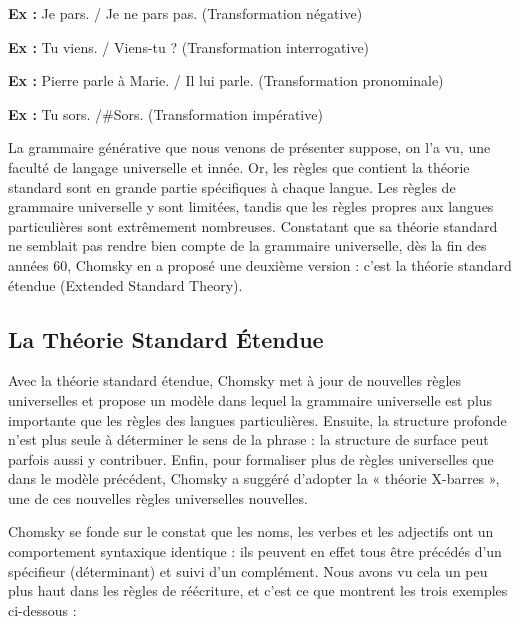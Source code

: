 
\noindent\textbf{Ex :} Je pars. / Je ne pars pas. (Transformation négative)\par

\noindent\textbf{Ex :} Tu viens. / Viens-tu ? (Transformation interrogative)\par

\noindent\textbf{Ex :} Pierre parle à Marie. / Il lui parle. (Transformation pronominale) \par

\noindent\textbf{Ex :} Tu sors. /\#Sors. (Transformation impérative)\par

La grammaire générative que nous venons de présenter suppose, on l’a vu, une faculté de langage universelle et innée. Or, les règles que contient la théorie standard sont en grande partie spécifiques à chaque langue. Les règles de grammaire universelle y sont limitées, tandis que les règles propres aux langues particulières sont extrêmement nombreuses. Constatant que sa théorie standard ne semblait pas rendre bien compte de la grammaire universelle, dès la fin des années 60, Chomsky en a proposé une deuxième version : c’est la théorie standard étendue (Extended Standard Theory).\par

\subsection{La Théorie Standard Étendue}
Avec la théorie standard étendue, Chomsky met à jour de nouvelles règles universelles et propose un modèle dans lequel la grammaire universelle est plus importante que les règles des langues particulières. Ensuite, la structure profonde n’est plus seule à déterminer le sens de la phrase : la structure de surface peut parfois aussi y contribuer. Enfin, pour formaliser plus de règles universelles que dans le modèle précédent, Chomsky a suggéré d’adopter la « théorie X-barres », une de ces nouvelles règles universelles nouvelles.\par

Chomsky se fonde sur le constat que les noms, les verbes et les adjectifs ont un comportement syntaxique identique : ils peuvent en effet tous être précédés d’un spécifieur (déterminant) et suivi d’un complément. Nous avons vu cela un peu plus haut dans les règles de réécriture, et c’est ce que montrent les trois exemples ci-dessous :\par

